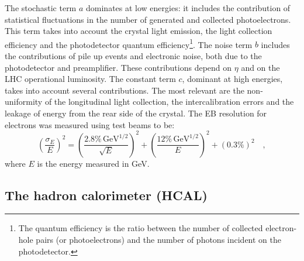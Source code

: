 The stochastic term $a$ dominates at low energies: it includes the contribution of statistical fluctuations in the number of generated and collected photoelectrons. This term takes into account the crystal light emission, the light collection efficiency and the photodetector quantum efficiency\footnote{The quantum efficiency is the ratio between the number of collected electron-hole pairs (or photoelectrons) and the number of photons incident on the photodetector.}. The noise term $b$ includes the contributions of pile up events and electronic noise, both due to the photodetector and preamplifier. These contributions depend on $\eta$ and on the LHC operational luminosity.
The constant term $c$, dominant at high energies, takes into account several contributions. The most relevant are the non-uniformity of the longitudinal light collection, the intercalibration errors and the leakage of energy from the rear side of the crystal. The EB resolution for electrons was measured using test beams to be:
\begin{equation}
\left(\frac{\sigma_E}{E}\right)^2 = \left(\frac{2.8\%\,\mathrm{GeV^{1/2}}}{\sqrt{E}}\right)^2 + \left(\frac{12\%\,\mathrm{GeV^{1/2}}}{E}\right)^2 + (0.3\%)^2 \quad,
\end{equation}
where $E$ is the energy measured in GeV.

\subsection{The hadron calorimeter (HCAL)}

